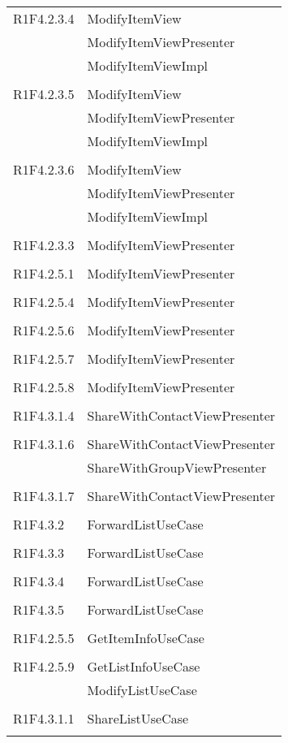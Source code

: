 \begin{center}
\begin{longtable}{|p{7cm}|p{5cm}|}
		R1F4.2.3.4 & ModifyItemView \\ & ModifyItemViewPresenter \\ & ModifyItemViewImpl \\ & \\ \hline
		R1F4.2.3.5 & ModifyItemView \\ & ModifyItemViewPresenter \\ & ModifyItemViewImpl \\ & \\ \hline
		R1F4.2.3.6 & ModifyItemView \\ & ModifyItemViewPresenter \\ & ModifyItemViewImpl \\ & \\ \hline
		R1F4.2.3.3 & ModifyItemViewPresenter \\ & \\ \hline
		R1F4.2.5.1 & ModifyItemViewPresenter \\ & \\ \hline
		R1F4.2.5.4 & ModifyItemViewPresenter \\ & \\ \hline
		R1F4.2.5.6 & ModifyItemViewPresenter \\ & \\ \hline
		R1F4.2.5.7 & ModifyItemViewPresenter \\ & \\ \hline
		R1F4.2.5.8 & ModifyItemViewPresenter \\ & \\ \hline
		R1F4.3.1.4 & ShareWithContactViewPresenter \\ & \\ \hline
		R1F4.3.1.6 & ShareWithContactViewPresenter \\ & ShareWithGroupViewPresenter \\ & \\ \hline
		R1F4.3.1.7 & ShareWithContactViewPresenter \\ & \\ \hline
		R1F4.3.2 & ForwardListUseCase \\ & \\ \hline
		R1F4.3.3 & ForwardListUseCase \\ & \\ \hline
		R1F4.3.4 & ForwardListUseCase \\ & \\ \hline
		R1F4.3.5 & ForwardListUseCase \\ & \\ \hline
		R1F4.2.5.5 & GetItemInfoUseCase \\ & \\ \hline
		R1F4.2.5.9 & GetListInfoUseCase \\ & ModifyListUseCase \\ & \\ \hline
		R1F4.3.1.1 & ShareListUseCase \\ & \\ \hline
	\end{longtable}
\end{center}
